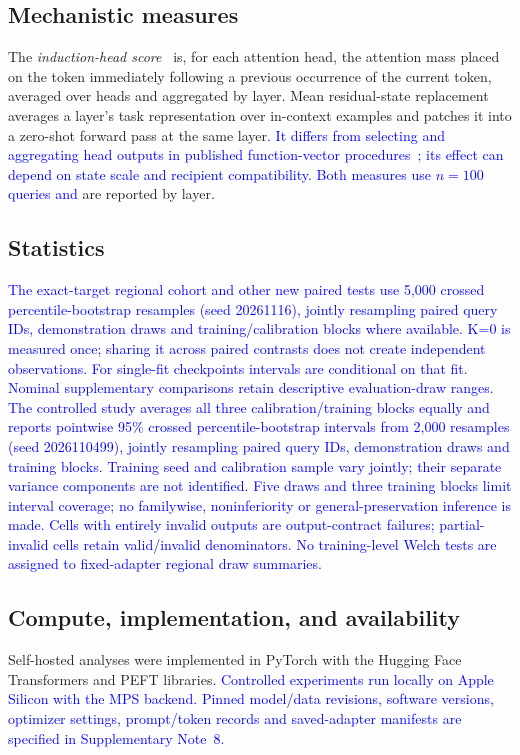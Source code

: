 \documentclass[pdflatex, sn-nature]{sn-jnl}%
\theoremstyle{thmstyleone}%
\theoremstyle{thmstyletwo}%
\theoremstyle{thmstylethree}%
\begin{document}
\subsection{Mechanistic measures}
The \emph{induction-head score}~\cite{olsson2022induction} is, for each attention head, the
attention mass placed on the token immediately following a previous occurrence of the
current token, averaged over heads and aggregated by layer. Mean residual-state
replacement averages a layer's task representation over in-context examples and patches
it into a zero-shot forward pass at the same layer\textcolor{blue}{. It differs from selecting and aggregating head outputs
in published function-vector procedures}~\textcolor{blue}{\cite{hendel2023taskvectors,todd2024functionvectors}}\textcolor{blue}{;
its effect can depend on state scale and recipient compatibility. Both measures
use $n{=}100$ queries and} are reported by layer.

\subsection{Statistics}
\textcolor{blue}{The exact-target regional cohort and other new paired tests use 5,000 crossed percentile-bootstrap resamples (seed 20261116), jointly resampling paired query IDs, demonstration draws and training/calibration blocks where available. K=0 is measured once; sharing it across paired contrasts does not create independent observations. For single-fit checkpoints intervals are conditional on that fit. Nominal supplementary comparisons retain descriptive evaluation-draw ranges.
The controlled study averages all three calibration/training blocks equally and
reports pointwise 95\%} \textcolor{blue}{crossed percentile-bootstrap intervals from 2,000 resamples
(seed 2026110499), jointly resampling paired query IDs, demonstration draws and
training blocks. Training seed and calibration sample vary jointly; their separate
variance components are not identified. Five draws and three training blocks limit
interval coverage; no familywise, noninferiority or general-preservation inference
is made. Cells with entirely invalid outputs are output-contract failures; partial-invalid
cells retain valid/invalid denominators. No training-level Welch tests are assigned
to fixed-adapter regional draw summaries.}

\subsection{Compute, implementation, and availability}
Self-hosted analyses were implemented in PyTorch with the Hugging Face Transformers and
PEFT libraries\textcolor{blue}{. Controlled experiments run locally on Apple Silicon with the MPS
backend. Pinned model/data revisions, software versions, optimizer settings,
prompt/token records and saved-adapter manifests are specified in Supplementary Note}~\textcolor{blue}{8.}
\end{document}
